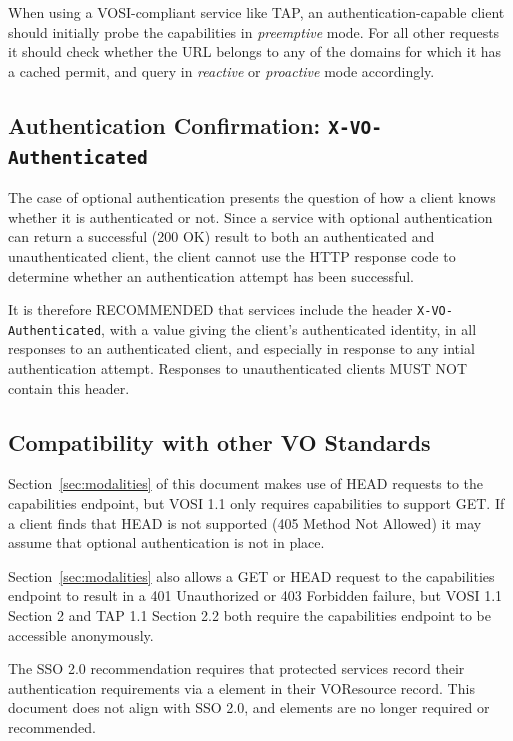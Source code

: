 \documentclass[11pt,a4paper]{ivoa}
\newcommand{\header}[1]{{\tt #1}}
\begin{document}
When using a VOSI-compliant service like TAP,
an authentication-capable client should initially probe
the capabilities in {\em preemptive\/} mode.
For all other requests it should check whether the URL
belongs to any of the domains for which it has a cached permit,
and query in {\em reactive\/} or {\em proactive\/} mode accordingly.


\subsection{Authentication Confirmation: {\tt X-VO-Authenticated}}

The case of optional authentication presents the question
of how a client knows whether it is authenticated or not.
Since a service with optional authentication can return
a successful (200 OK) result to both an authenticated and unauthenticated
client,
the client cannot use the HTTP response code to determine whether
an authentication attempt has been successful.

It is therefore RECOMMENDED that services include the header
\header{X-VO-Authenticated}, with a value giving the client's
authenticated identity, in all responses to an authenticated client,
and especially in response to any intial authentication attempt.
Responses to unauthenticated clients MUST NOT contain this header.


\subsection{Compatibility with other VO Standards}

Section~\ref{sec:modalities} of this document
makes use of HEAD requests to the capabilities endpoint,
but VOSI 1.1 \citep{2017ivoa.spec.0524G}
only requires capabilities to support GET.
If a client finds that HEAD is not supported (405 Method Not Allowed)
it may assume that optional authentication is not in place.

Section~\ref{sec:modalities} also allows a GET or HEAD request
to the capabilities endpoint to result in a
401 Unauthorized or 403 Forbidden failure,
but VOSI 1.1 Section 2 and TAP 1.1 Section 2.2 both require
the capabilities endpoint to be accessible anonymously.

The SSO 2.0 recommendation \citep{2017ivoa.spec.0524T}
requires that protected services
record their authentication requirements via a
 element in their VOResource record.
This document does not align with SSO 2.0,
and  elements are no longer required or recommended.
\end{document}
